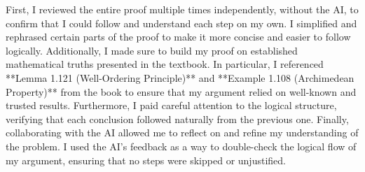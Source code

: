 \documentclass{article}
\begin{document}
First, I reviewed the entire proof multiple times independently, without the AI, to confirm that I could follow and understand each step on my own. I simplified and rephrased certain parts of the proof to make it more concise and easier to follow logically. Additionally, I made sure to build my proof on established mathematical truths presented in the textbook. In particular, I referenced **Lemma 1.121 (Well-Ordering Principle)** and **Example 1.108 (Archimedean Property)** from the book to ensure that my argument relied on well-known and trusted results. Furthermore, I paid careful attention to the logical structure, verifying that each conclusion followed naturally from the previous one. Finally, collaborating with the AI allowed me to reflect on and refine my understanding of the problem. I used the AI’s feedback as a way to double-check the logical flow of my argument, ensuring that no steps were skipped or unjustified.
\end{document}
